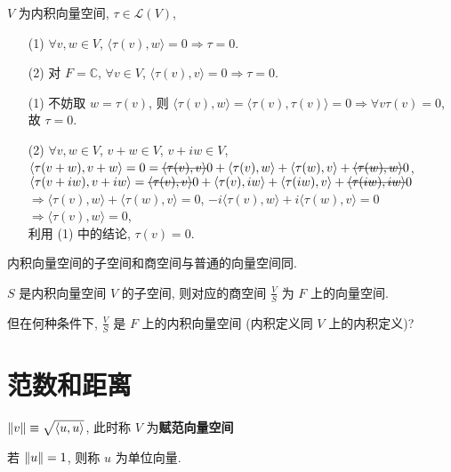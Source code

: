 \documentclass{note}
\begin{document}
\begin{thm}
    $V$ 为内积向量空间, $\tau\in\mathcal{L}(V)$,
    \begin{itemize}
        \item[(1)] $\forall v,w\in V$, $\langle\tau(v),w\rangle=0\Longrightarrow\tau=0$.
        \item[(2)] 对 $F=\mathbb{C}$, $\forall v\in V$, $\langle\tau(v),v\rangle=0\Longrightarrow\tau=0$.
    \end{itemize}
\end{thm}
\begin{pf}
    \begin{itemize}
        \item[(1)] 不妨取 $w=\tau(v)$, 则 $\langle\tau(v),w\rangle=\langle\tau(v),\tau(v)\rangle=0\Longrightarrow\forall v\tau(v)=0$, 故 $\tau=0$.
        \item[(2)] $\forall v,w\in V$, $v+w\in V$, $v+iw\in V$,\\
        $\langle\tau(v+w),v+w\rangle=0=\msout{\langle\tau(v),v\rangle}0+\langle\tau(v),w\rangle+\langle\tau(w),v\rangle+\msout{\langle\tau(w),w\rangle}0$, $\langle\tau(v+iw),v+iw\rangle=\msout{\langle\tau(v),v\rangle}0+\langle\tau(v),iw\rangle+\langle\tau(iw),v\rangle+\msout{\langle\tau(iw),iw\rangle}0$\\
        $\Longrightarrow\langle\tau(v),w\rangle+\langle\tau(w),v\rangle=0$, $-i\langle\tau(v),w\rangle+i\langle\tau(w),v\rangle=0$\\
        $\Longrightarrow\langle\tau(v),w\rangle=0$,\\
        利用 (1) 中的结论, $\tau(v)=0$.
    \end{itemize}
\end{pf}

内积向量空间的子空间和商空间与普通的向量空间同.

$S$ 是内积向量空间 $V$ 的子空间, 则对应的商空间 $\frac{V}{S}$ 为 $F$ 上的向量空间.

但在何种条件下, $\frac{V}{S}$ 是 $F$ 上的内积向量空间 (内积定义同 $V$ 上的内积定义)?

\section{范数和距离}
\begin{df}
    $\left\lVert v\right\rVert\equiv\sqrt{\langle u,u\rangle}$, 此时称 $V$ 为\textbf{赋范向量空间}
\end{df}

\begin{df}[单位向量]
    若 $\left\lVert u\right\rVert=1$, 则称 $u$ 为单位向量.
\end{df}
\end{document}
